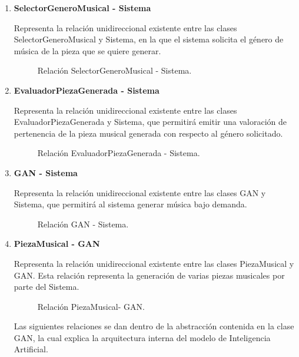 \begin{enumerate}
  \item \textbf{SelectorGeneroMusical - Sistema}

  Representa la relación unidireccional existente entre las clases SelectorGeneroMusical y Sistema, en la que el sistema solicita el género de música de la pieza que se quiere generar.

  \begin{figure}[H]
    \centering
    
    \caption{Relación SelectorGeneroMusical - Sistema.}
  \end{figure}

  \item \textbf{EvaluadorPiezaGenerada - Sistema}

  Representa la relación unidireccional existente entre las clases EvaluadorPiezaGenerada y Sistema, que permitirá emitir una valoración de pertenencia de la pieza musical generada con respecto al género solicitado.

  \begin{figure}[H]
    \centering
    
    \caption{Relación EvaluadorPiezaGenerada - Sistema.}
  \end{figure}

  \item \textbf{GAN - Sistema}

  Representa la relación unidireccional existente entre las clases GAN y Sistema, que permitirá al sistema generar música bajo demanda.

  \begin{figure}[H]
    \centering
    
    \caption{Relación GAN - Sistema.}
  \end{figure}

  \item \textbf{PiezaMusical - GAN}

  Representa la relación unidireccional existente entre las clases PiezaMusical y GAN. Esta relación representa la generación de varias piezas musicales por parte del Sistema.

  \begin{figure}[H]
    \centering
    
    \caption{Relación PiezaMusical- GAN.}
  \end{figure}

  Las siguientes relaciones se dan dentro de la abstracción contenida en la clase GAN, la cual explica la arquitectura interna del modelo de Inteligencia Artificial.


\end{enumerate}
